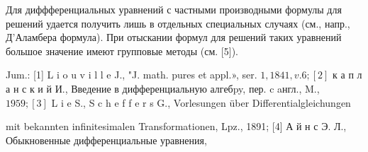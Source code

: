 \documentclass[10pt]{article}
\begin{document}
Для диффференциальных уравнений с частными производными формулы для решений удается получить лишь в отдельных специальных случаях (см., напр., Д'Аламбера формула). При отыскании формул для решений таких уравнений большое значение имеют групповые методы (см. [5]).



Jum.: [1] L i o u v i l l e J., "J. math. pures et appl.», ser. $1,1841, v .6 ;[2]$ к а п л а н с к и й И., Введение в дифференциальную алгебpy, пер. c aнгл., M., $1959 ;[3]$ L i e S., S c h e f f e r s G., Vorlesungen über Differentialgleichungen

mit bekannten infinitesimalen Transformationen, Lpz., 1891; [4] А й н с Э. Л., Обыкновенные дифференциальные уравнения,
\end{document}
